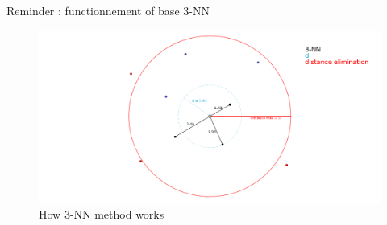 \begin{frame}{Reminder : functionnement of base 3-NN}
    \begin{figure}
        \includegraphics[height=0.6\paperheight]{images/illustration_3-NN.png}
        \caption{\label{fig:illus-3-NN}How 3-NN method works}
    \end{figure}
\end{frame}